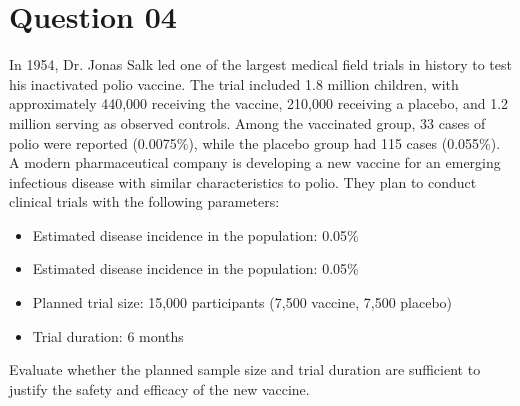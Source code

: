 \documentclass{article}
\begin{document}
\section*{Question 04}
In 1954, Dr. Jonas Salk led one of the largest medical field trials in history
to test
his inactivated polio vaccine. The trial included 1.8 million children, with
approximately 440,000 receiving the vaccine, 210,000 receiving a placebo, and
1.2 million serving as observed controls. Among the vaccinated group, 33 cases
of polio were reported (0.0075\%), while the placebo group had 115 cases
(0.055\%). A modern pharmaceutical company is developing a new vaccine for an
emerging infectious disease with similar characteristics to polio. They plan to
conduct clinical trials with the following parameters:
\begin{itemize}
    \item Estimated disease incidence in the population: 0.05\%
    \item Estimated disease incidence in the population: 0.05\%
    \item Planned trial size: 15,000 participants (7,500 vaccine, 7,500
          placebo)
    \item Trial duration: 6 months
\end{itemize}
Evaluate whether the planned sample size and trial duration are sufficient to
justify the safety and efficacy of the new vaccine.
\\\\
\end{document}
